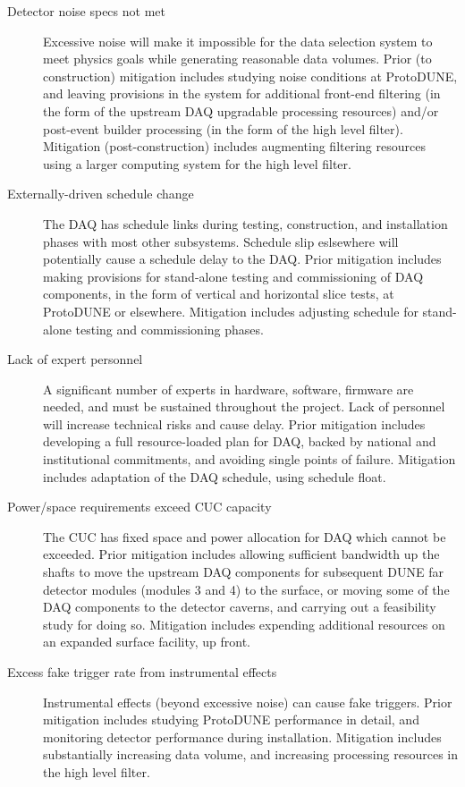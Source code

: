 \begin{description}
\item[Detector noise specs not met] Excessive noise will make it
  impossible for the data selection system to meet physics goals while
  generating reasonable data volumes. Prior (to construction) mitigation includes
  studying noise conditions at ProtoDUNE, and leaving provisions in the
  system for additional front-end filtering (in the form of the
  upstream DAQ upgradable processing resources) and/or post-event builder processing (in
  the form of the high level filter). Mitigation (post-construction) includes augmenting
  filtering resources using a larger computing system for the high
  level filter.

\item[Externally-driven schedule change] The DAQ has schedule links during
  testing, construction, and installation phases with most other
  subsystems. Schedule slip eslsewhere will potentially cause a schedule
  delay to the DAQ. Prior mitigation includes making provisions for
  stand-alone testing and commissioning of DAQ components, in the form
  of vertical and horizontal slice tests, at ProtoDUNE or
  elsewhere. Mitigation includes adjusting schedule for stand-alone
  testing and commissioning phases. 

\item[Lack of expert personnel] A significant number of experts in
  hardware, software, firmware are needed, and must be sustained
  throughout the project. Lack of personnel will increase technical
  risks and cause delay. Prior mitigation includes developing a full
  resource-loaded plan for DAQ, backed by national and institutional
  commitments, and avoiding single points of failure. Mitigation
  includes adaptation of the DAQ schedule, using schedule float.

\item[Power/space requirements exceed CUC capacity] The CUC has fixed
  space and power allocation for DAQ 
which cannot be exceeded.  Prior mitigation includes allowing
sufficient bandwidth up the shafts to move the upstream DAQ components for
subsequent DUNE far detector modules (modules 3 and 4) to the
surface, or moving some of the DAQ components to the detector caverns,
and carrying out a feasibility study for doing so. 
Mitigation includes expending additional resources on an
expanded surface facility, up front.

\item[Excess fake trigger rate from instrumental effects] Instrumental
  effects (beyond excessive noise) can cause fake triggers. Prior
  mitigation includes studying ProtoDUNE performance in detail, and monitoring detector
  performance during installation. Mitigation includes substantially increasing
  data volume, and increasing processing resources in the high level
  filter.


\end{description}
